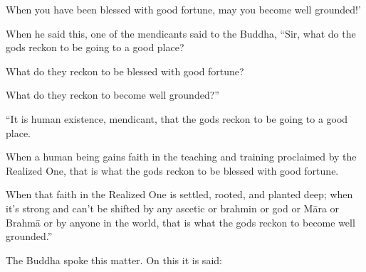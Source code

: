 \documentclass[12pt,openany]{book}%
\begin{document}
When you have been blessed with good fortune, may you become well grounded!’ 

When he said this, one of the mendicants said to the Buddha, “Sir, what do the gods reckon to be going to a good place? 

What do they reckon to be blessed with good fortune? 

What do they reckon to become well grounded?” 

“It is human existence, mendicant, that the gods reckon to be going to a good place. 

When a human being gains faith in the teaching and training proclaimed by the Realized One, that is what the gods reckon to be blessed with good fortune. 

When that faith in the Realized One is settled, rooted, and planted deep; when it’s strong and can’t be shifted by any ascetic or brahmin or god or \textsanskrit{Māra} or \textsanskrit{Brahmā} or by anyone in the world, that is what the gods reckon to become well grounded.” 

The Buddha spoke this matter. On this it is said: 
\end{document}
